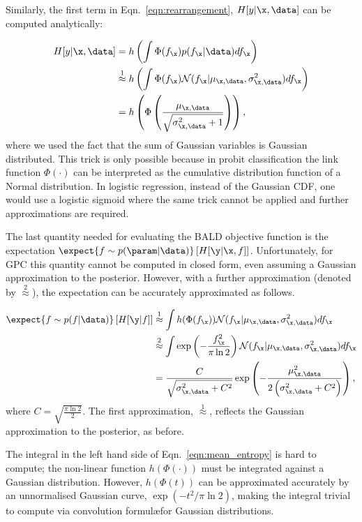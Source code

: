 Similarly, the first term in Eqn.\ \eqref{eqn:rearrangement}, $H[y\vert\x,\data]$ can be computed analytically:

\begin{align}
	H[y\vert\x,\data] &= h\left( \int \Phi( f_{\x} ) p(f_{\x}\vert\data) df_{\x} \right)\\
	&\stackrel{1}{\approx} h\left( \int \Phi( f_{\x} )  \mathcal{N}(f_{\x}\vert \mu_{\x,\data},\sigma_{\x,\data}^2) df_{\x} \right) \\
	&= h \left( \Phi\left( \frac{\mu_{\x,\data}}{\sqrt{\sigma^2_{\x,\data} + 1}} \right)\right)\label{ent_mean},
\end{align}
where we used the fact that the sum of Gaussian variables is Gaussian distributed. This trick is only possible because in probit classification the link function $\Phi(\cdot)$ can be interpreted as the cumulative distribution function of a Normal distribution. In logistic regression, instead of the Gaussian CDF, one would use a logistic sigmoid where the same trick cannot be applied and further approximations are required.

The last quantity needed for evaluating the BALD objective function is the expectation $\expect{f\sim p(\param|\data)} \left[ H[\y \vert \x,f] \right]$. Unfortunately, for GPC this quantity cannot be computed in closed form, even assuming a Gaussian approximation to the posterior. However, with a further approximation (denoted by $\stackrel{2}{\approx}$), the expectation can be accurately approximated as follows.

\begin{align}
	\expect{f \sim p(f\vert\data)} \left[ H[\y\vert f] \right] &\stackrel{1}{\approx}\int h(\Phi(f_{\x})) \mathcal{N}(f_{\x}\vert \mu_{\x,\data},\sigma_{\x,\data}^2)df_{\x}\label{eqn:mean_entropy}\\
	&\stackrel{2}{\approx} \int \exp\left(-\frac{f_{\x}^2}{\pi\ln2}\right) \mathcal{N}(f_{\x}\vert \mu_{\x,\data},\sigma_{\x,\data}^2)df_{\x}\\	
	&= \frac{C}{\sqrt{\sigma_{\x,\data}^2 + C^2}}\exp\left(-\frac{\mu_{\x,\data}^2}{2\left(\sigma_{\x,\data}^2 + C^2\right)}\right),
\end{align}
where $C=\sqrt{\frac{\pi\ln2}{2}}$. The first approximation, {\scriptsize $\stackrel{1}{\approx}$}, reflects the Gaussian approximation to the posterior, as before.

The integral in the left hand side of Eqn.\ \eqref{eqn:mean_entropy} is hard to compute; the non-linear function $h(\Phi(\cdot))$ must be integrated against a Gaussian distribution. However, $h(\Phi(t))$ can be approximated accurately by an unnormalised Gaussian curve, $\exp(-t^2/\pi\ln2)$, making the integral trivial to compute via convolution formul\ae for Gaussian distributions.

